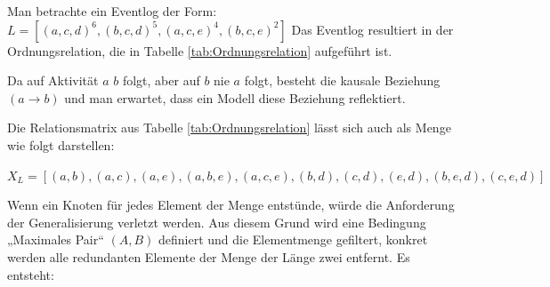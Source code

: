 Man betrachte ein Eventlog der Form: $L = [(a, c, d)^6, (b, c, d)^5, (a, c, e)^4, (b, c, e)^2]$
Das Eventlog resultiert in der Ordnungsrelation, die in Tabelle \ref{tab:Ordnungsrelation} aufgeführt ist.
\begin{table}[!ht]
\centering
{}
\caption{Ordnungsrelation zu einem Eventlog $L$ auf Basis des $\alpha$-Miner Verfahrens}
\label{tab:Ordnungsrelation}
\end{table}
\newline
Da auf Aktivität $a$ $b$ folgt, aber auf $b$ nie $a$ folgt, besteht die kausale Beziehung $(a→b)$ und man erwartet, dass ein Modell diese Beziehung reflektiert.

Die Relationsmatrix aus Tabelle \ref{tab:Ordnungsrelation} lässt sich auch als Menge wie folgt darstellen:

$ X_L={ [({a}, {b}), ({a}, {c}), ({a}, {e}), ({a}, {b, e}),
({a}, {c, e}), ({b}, {d}), ({c}, {d}), ({e}, {d}),
({b, e}, {d}), ({c, e}, {d}) ]}$

Wenn ein Knoten für jedes Element der Menge entstünde, würde die Anforderung der Generalisierung verletzt werden. Aus diesem Grund wird eine Bedingung „Maximales Pair“ $(A,B)$ definiert und die Elementmenge gefiltert, konkret werden alle redundanten Elemente der Menge der Länge zwei entfernt. Es entsteht:

